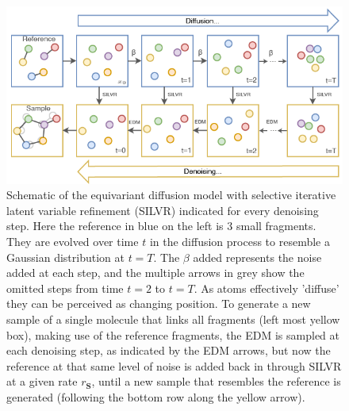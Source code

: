 \documentclass[journal=jacsat,manuscript=article]{achemso}
\begin{document}
\begin{figure}[h!]
    \centering
    \includegraphics[width=\textwidth]{paper/Figures/Fig1/Schematic_new.png}
    \caption{Schematic of the equivariant diffusion model with  selective iterative latent variable refinement (SILVR) indicated for every denoising step. Here the reference in blue on the left is 3 small fragments. They are evolved over time $t$ in the diffusion process to resemble a Gaussian distribution at $t=T$. The $\beta$ added represents the noise added at each step, and the multiple arrows in grey show the omitted steps from time $t=2$ to $t=T$. As atoms effectively 'diffuse' they can be perceived as changing position. To generate a new sample of a single molecule that links all fragments (left most yellow box), making use of the reference fragments, the EDM is sampled at each denoising step, as indicated by the EDM arrows, but now the reference at that same level of noise is added back in through SILVR at a given rate $r_{\mathbf{S}}$, until a new sample that resembles the reference is generated (following the bottom row along the yellow arrow).}
    \label{fig:schematic}
\end{figure}
\end{document}
